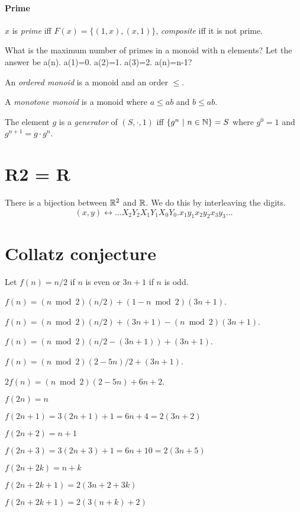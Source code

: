 \paragraph{Prime}
\(x\) is
\emph{prime} iff \(F(x) = \{(1,x),(x,1)\}\),
\emph{composite} iff it is not prime.

What is the maximum number of primes in a monoid with n elements?
Let the answer be a(n).
a(1)=0. a(2)=1. a(3)=2. a(n)=n-1?

An \emph{ordered monoid} is a monoid and an order \(\le\).

A \emph{monotone monoid} is a monoid where \(a \le ab\) and \(b \le ab\).

The element \(g\) is a
%
\emph{generator} of \((S,\cdot,1)\) iff \(\{g^n ~|~ n \in \mathbb{N}\} = S\)
where \(g^0 = 1\) and \(g^{n+1} = g \cdot g^n\).

\section{R2 = R}

There is a bijection between \(\mathbb{R}^2\) and \(\mathbb{R}\).
We do this by interleaving the digits.
\[
    (x, y) \leftrightarrow \ldots X_2 Y_2 X_1 Y_1 X_0 Y_0 . x_1 y_1 x_2 y_2 x_3 y_3 \ldots
\]

\section{Collatz conjecture}

Let \(f(n) = n/2\) if \(n\) is even or \(3n+1\) if \(n\) is odd.

\(f(n) = (n \bmod 2) (n/2) + (1 - n \bmod 2) (3n + 1)\).

\(f(n) = (n \bmod 2) (n/2) + (3n + 1) - (n \bmod 2) (3n + 1)\).

\(f(n) = (n \bmod 2) (n/2 - (3n + 1)) + (3n + 1)\).

\(f(n) = (n \bmod 2) (2 - 5n)/2 + (3n + 1)\).

\(2 f(n) = (n \bmod 2) (2 - 5n) + 6n + 2\).

\(f(2n) = n\)

\(f(2n+1) = 3(2n+1)+1 = 6n+4 = 2(3n+2)\)

\(f(2n+2) = n+1\)

\(f(2n+3) = 3(2n+3)+1 = 6n+10 = 2(3n+5)\)

\(f(2n+2k) = n+k\)

\(f(2n+2k+1) = 2(3n+2+3k)\)

\(f(2n+2k+1) = 2(3(n+k)+2)\)

